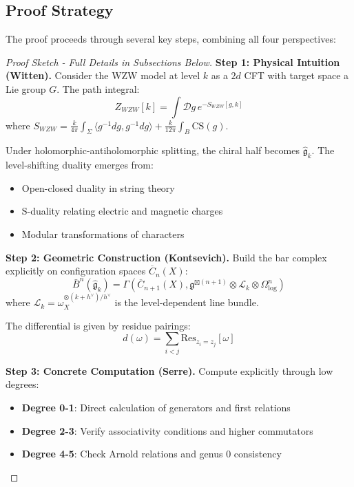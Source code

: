 \subsection{Proof Strategy}

The proof proceeds through several key steps, combining all four perspectives:

\begin{proof}[Proof Sketch - Full Details in Subsections Below]
\textbf{Step 1: Physical Intuition (Witten).} 
Consider the WZW model at level $k$ as a $2d$ CFT with target space a Lie group $G$. The path integral:
\begin{equation}
Z_{WZW}[k] = \int \mathcal{D}g \, e^{-S_{WZW}[g,k]}
\end{equation}
where $S_{WZW} = \frac{k}{4\pi} \int_\Sigma \langle g^{-1}dg, g^{-1}dg\rangle + \frac{k}{12\pi} \int_B \text{CS}(g)$.

Under holomorphic-antiholomorphic splitting, the chiral half becomes $\widehat{\mathfrak{g}}_k$. The level-shifting duality emerges from:
\begin{itemize}
\item Open-closed duality in string theory
\item S-duality relating electric and magnetic charges
\item Modular transformations of characters
\end{itemize}

\textbf{Step 2: Geometric Construction (Kontsevich).}
Build the bar complex explicitly on configuration spaces $\overline{C}_n(X)$:
\begin{equation}
\bar{B}^n(\widehat{\mathfrak{g}}_k) = \Gamma(\overline{C}_{n+1}(X), \mathfrak{g}^{\boxtimes(n+1)} \otimes \mathcal{L}_k \otimes \Omega^n_{\log})
\end{equation}
where $\mathcal{L}_k = \omega_X^{\otimes(k+h^\vee)/h^\vee}$ is the level-dependent line bundle.

The differential is given by residue pairings:
\begin{equation}
d(\omega) = \sum_{i < j} \mathrm{Res}_{z_i=z_j}[\omega]
\end{equation}

\textbf{Step 3: Concrete Computation (Serre).}
Compute explicitly through low degrees:
\begin{itemize}
\item \textbf{Degree 0-1}: Direct calculation of generators and first relations
\item \textbf{Degree 2-3}: Verify associativity conditions and higher commutators  
\item \textbf{Degree 4-5}: Check Arnold relations and genus 0 consistency
\end{itemize}


\end{proof}
